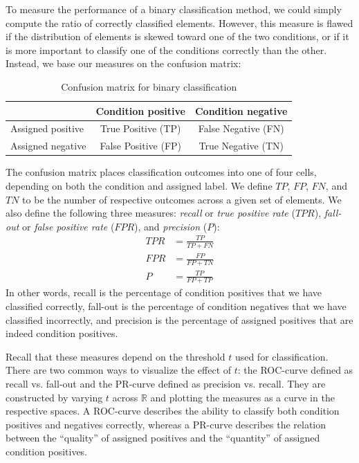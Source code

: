 \documentclass[thesis.tex]{subfiles}
\newcommand\TPR{\mathit{TPR}}
\newcommand\FPR{\mathit{FPR}}
\newcommand\Prec{\mathit{P}}
\newcommand\TP{\mathit{TP}}
\newcommand\FP{\mathit{FP}}
\newcommand\TN{\mathit{TN}}
\newcommand\FN{\mathit{FN}}
\begin{document}
To measure the performance of a binary classification method, we could simply compute the ratio of correctly classified elements. However, this measure is flawed if the distribution of elements is skewed toward one of the two conditions, or if it is more important to classify one of the conditions correctly than the other. Instead, we base our measures on the confusion matrix:
%
\begin{table}[H]
	\centering
	\bgroup
	\def\arraystretch{1.5}
	\begin{tabular}{|l|c|c|}
		\cline{2-3}
		\multicolumn{1}{c|}{} & Condition positive & Condition negative \\ \hline
		Assigned positive & \cellcolor{green!25}True Positive (TP) & \cellcolor{red!25}False Negative (FN)  \\ \hline
		Assigned negative & \cellcolor{red!25}False Positive (FP) & \cellcolor{green!25}True Negative (TN) \\ \hline
	\end{tabular}
	\egroup
	\caption{Confusion matrix for binary classification}
	\label{tbl:confusion_matrix}
\end{table}
%
The confusion matrix places classification outcomes into one of four cells, depending on both the condition and assigned label. We define $\TP$, $\FP$, $\FN$, and $\TN$ to be the number of respective outcomes across a given set of elements. We also define the following three measures: \emph{recall} or \emph{true positive rate} ($\TPR$), \emph{fall-out} or \emph{false positive rate} ($\FPR$), and \emph{precision} ($\Prec$):
%
\begin{align*}
	\TPR &= \frac{\TP}{\TP + \FN} \\
	\FPR &= \frac{\FP}{\FP + \TN} \\
	\Prec &= \frac{\TP}{\FP + \TP}
\end{align*}
%
In other words, recall is the percentage of condition positives that we have classified correctly, fall-out is the percentage of condition negatives that we have classified incorrectly, and precision is the percentage of assigned positives that are indeed condition positives.

Recall that these measures depend on the threshold $t$ used for classification. There are two common ways to visualize the effect of $t$: the ROC-curve defined as recall vs. fall-out and the PR-curve defined as precision vs. recall. They are constructed by varying $t$ across $\mathbb{R}$ and plotting the measures as a curve in the respective spaces. A ROC-curve describes the ability to classify both condition positives and negatives correctly, whereas a PR-curve describes the relation between the ``quality'' of assigned positives and the ``quantity'' of assigned condition positives.
\end{document}
